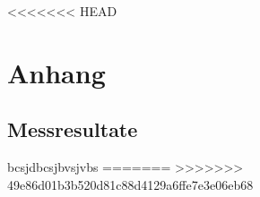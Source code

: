 <<<<<<< HEAD
\section{Anhang}\label{sec:anhang}

\subsection{Messresultate}\label{sec:messresultate}

bcsjdbcsjbvsjvbs
=======
>>>>>>> 49e86d01b3b520d81c88d4129a6ffe7e3e06eb68
